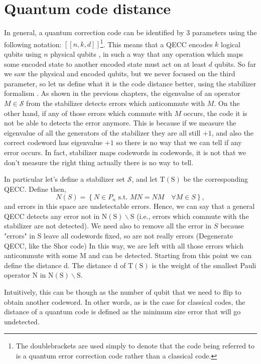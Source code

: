 \section{Quantum code distance} \label{sec:distance}
In general, a quantum correction code can be identified by 3 parameters using the following notation: $[[n, k, d]]$\footnote{The doublebrackets are used simply to denote that the code being referred to is a quantum error correction code rather than a classical code.}. This means that a QECC encodes $k$ logical qubits using $n$ physical qubits , in such a way that any operation which maps some encoded state to another encoded state must act on at least $d$ qubits. 
So far we saw the physical and encoded qubits, but we never focused on the third parameter, so let us define what it is the code distance better, using the stabilizer formalism \cite{gottesman2009introduction} \cite{Gottesman_summer}. 
As shown in the previous chapters, the eigenvalue of an operator $M \in \mathcal{S}$ from the stabilizer detects errors which anticommute with $M$.
On the other hand, if any of those errors which commute with $M$ occurs, the code it is not be able to detects the error anymore. This is because if we measure the eigenvalue of all the generators of the stabilizer they are all still $+1$, and also the correct codeword has eigenvalue $+1$ so there is no way that we can tell if any error occurs. In fact, stabilizer maps codewords in codewords, it is not that we don't measure the right thing actually there is no way to tell. 

In particular let's define a stabilizer set $\mathcal{S}$, and let $\mathrm{T}(\mathrm{S})$ be the corresponding QECC.
Define then,
$$
N(S)=\left\{N \in P_{n} \text { s.t. } M N=N M\quad \forall M \in S\right\},
$$
and errors in this space are undetectable errors. 
Hence, we can say that a general QECC detects any error not in $\mathrm{N}(\mathrm{S}) \backslash \mathrm{S}$ (i.e., errors which commute with the stabilizer are not detected). We need also to remove all the error in $S$ because "errors" in S leave all codewords fixed, so are not really errors (Degenerate QECC, like the Shor code)
In this way, we are left with all those errors which anticommute with some M and can be detected. Starting from this point we can define the distance d. 
The distance d of $\mathrm{T}(\mathrm{S})$ is the weight of the smallest Pauli operator $\mathrm{N}$ in $\mathrm{N}(\mathrm{S}) \backslash \mathrm{S}$.

Intuitively, this can be though as the number of qubit that we need to flip to obtain another codeword. In other words, as is the case for classical codes, the distance of a quantum code is defined as the minimum size error that will go undetected.

